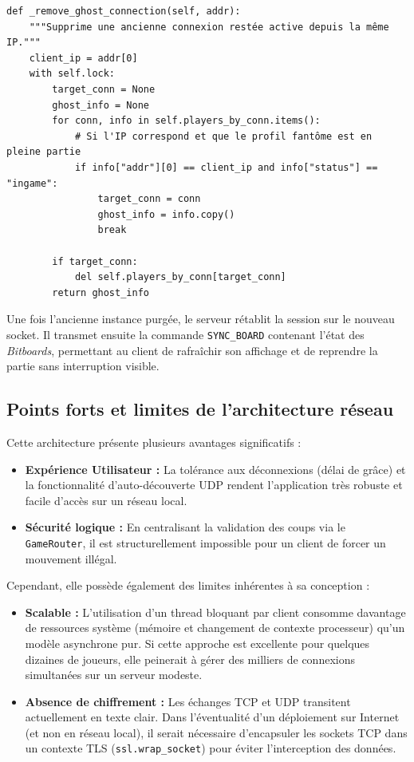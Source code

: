 \documentclass[a4paper]{article}
\begin{document}
\begin{verbatim}
def _remove_ghost_connection(self, addr):
    """Supprime une ancienne connexion restée active depuis la même IP."""
    client_ip = addr[0]
    with self.lock:
        target_conn = None
        ghost_info = None
        for conn, info in self.players_by_conn.items():
            # Si l'IP correspond et que le profil fantôme est en pleine partie
            if info["addr"][0] == client_ip and info["status"] == "ingame":
                target_conn = conn
                ghost_info = info.copy()
                break

        if target_conn:
            del self.players_by_conn[target_conn]
        return ghost_info
\end{verbatim}

Une fois l'ancienne instance purgée, le serveur rétablit la session sur le nouveau socket. Il transmet ensuite la commande \texttt{SYNC\_BOARD} contenant l'état des \textit{Bitboards}, permettant au client de rafraîchir son affichage et de reprendre la partie sans interruption visible.

\subsection{Points forts et limites de l'architecture réseau}

Cette architecture présente plusieurs avantages significatifs :
\begin{itemize}
    \item \textbf{Expérience Utilisateur :} La tolérance aux déconnexions (délai de grâce) et la fonctionnalité d'auto-découverte UDP rendent l'application très robuste et facile d'accès sur un réseau local.
    \item \textbf{Sécurité logique :} En centralisant la validation des coups via le \texttt{GameRouter}, il est structurellement impossible pour un client de forcer un mouvement illégal.
\end{itemize}

Cependant, elle possède également des limites inhérentes à sa conception :
\begin{itemize}
    \item \textbf{Scalable :} L'utilisation d'un thread bloquant par client consomme davantage de ressources système (mémoire et changement de contexte processeur) qu'un modèle asynchrone pur. Si cette approche est excellente pour quelques dizaines de joueurs, elle peinerait à gérer des milliers de connexions simultanées sur un serveur modeste.
    \item \textbf{Absence de chiffrement :} Les échanges TCP et UDP transitent actuellement en texte clair. Dans l'éventualité d'un déploiement sur Internet (et non en réseau local), il serait nécessaire d'encapsuler les sockets TCP dans un contexte TLS (\texttt{ssl.wrap\_socket}) pour éviter l'interception des données.
\end{itemize}
\end{document}
